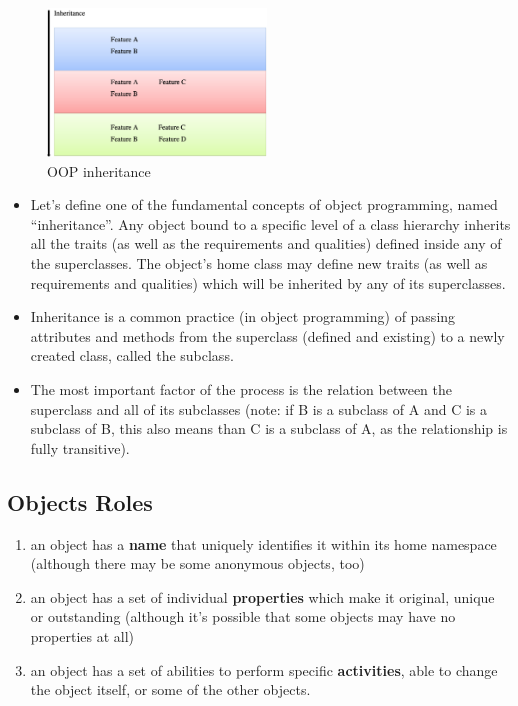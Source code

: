 \documentclass[11pt]{article}
\begin{document}
\begin{figure}[htbp]
\centering
\includegraphics[width=220px]{./images/OopInheritance.png}
\caption{OOP inheritance}
\end{figure}

\begin{itemize}
\item Let’s define one of the fundamental concepts of object programming,
named “inheritance”. Any object bound to a specific level of a class
hierarchy inherits all the traits (as well as the requirements and
qualities) defined inside any of the superclasses. The object’s home
class may define new traits (as well as requirements and qualities)
which will be inherited by any of its superclasses.

\item Inheritance is a common practice (in object programming) of passing
attributes and methods from the superclass (defined and existing) to
a newly created class, called the subclass.

\item The most important factor of the process is the relation between the
superclass and all of its subclasses (note: if B is a subclass of A
and C is a subclass of B, this also means than C is a subclass of A,
as the relationship is fully transitive).
\end{itemize}

\subsection{Objects Roles}
\label{sec:orgf8953cc}
\begin{enumerate}
\item an object has a \textbf{name} that uniquely identifies it within its home
namespace (although there may be some anonymous objects, too)
\item an object has a set of individual \textbf{properties} which make it
original, unique or outstanding (although it’s possible that some
objects may have no properties at all)
\item an object has a set of abilities to perform specific \textbf{activities},
able to change the object itself, or some of the other objects.
\end{enumerate}
\end{document}
